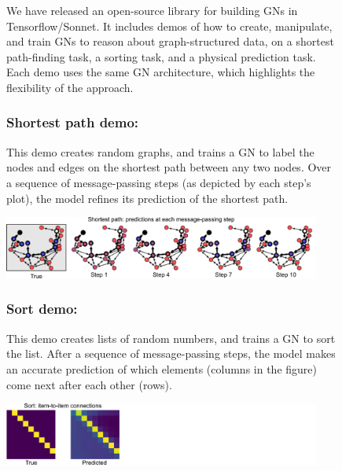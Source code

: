 \begin{figure}[t!]
\begin{infobox}

We have released an open-source library for building GNs in Tensorflow/Sonnet. 
It includes demos of how to create, manipulate, and train GNs to reason about graph-structured data, on a shortest path-finding task, a sorting task, and a physical prediction task. Each demo uses the same GN architecture, which highlights the flexibility of the approach.

\subsubsection*{Shortest path demo: }
This demo creates random graphs, and trains a GN to label the nodes and edges on the shortest path between any two nodes. Over a sequence of message-passing steps (as depicted by each step's plot), the model refines its prediction of the shortest path.
\begin{center}
\includegraphics[trim={0 0.0cm 0 0.3cm},width=0.93\textwidth]{figures/demo_shortest_path}
\end{center}

\subsubsection*{Sort demo: }
This demo creates lists of random numbers, and trains a GN to sort the list. After a sequence of message-passing steps, the model makes an accurate prediction of which elements (columns in the figure) come next after each other (rows).
\begin{center}
\includegraphics[trim={0 0.0cm 0 0.3cm},width=0.93\textwidth]{figures/demo_sort}
\end{center}


\end{infobox}
\end{figure}
